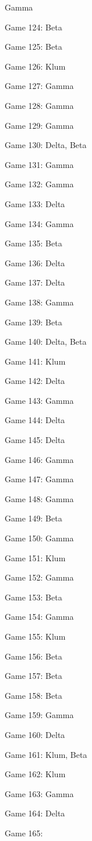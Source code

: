 \documentclass{article}
\begin{document}
\begin{multicols}{3}
\begin{compactitem}
Gamma
\item Game 124:
Beta
\item Game 125:
Beta
\item Game 126:
Klum
\item Game 127:
Gamma
\item Game 128:
Gamma
\item Game 129:
Gamma
\item Game 130:
Delta, Beta
\item Game 131:
Gamma
\item Game 132:
Gamma
\item Game 133:
Delta
\item Game 134:
Gamma
\item Game 135:
Beta
\item Game 136:
Delta
\item Game 137:
Delta
\item Game 138:
Gamma
\item Game 139:
Beta
\item Game 140:
Delta, Beta
\item Game 141:
Klum
\item Game 142:
Delta
\item Game 143:
Gamma
\item Game 144:
Delta
\item Game 145:
Delta
\item Game 146:
Gamma
\item Game 147:
Gamma
\item Game 148:
Gamma
\item Game 149:
Beta
\item Game 150:
Gamma
\item Game 151:
Klum
\item Game 152:
Gamma
\item Game 153:
Beta
\item Game 154:
Gamma
\item Game 155:
Klum
\item Game 156:
Beta
\item Game 157:
Beta
\item Game 158:
Beta
\item Game 159:
Gamma
\item Game 160:
Delta
\item Game 161:
Klum, Beta
\item Game 162:
Klum
\item Game 163:
Gamma
\item Game 164:
Delta
\item Game 165:

\end{compactitem}
\end{multicols}
\end{document}
